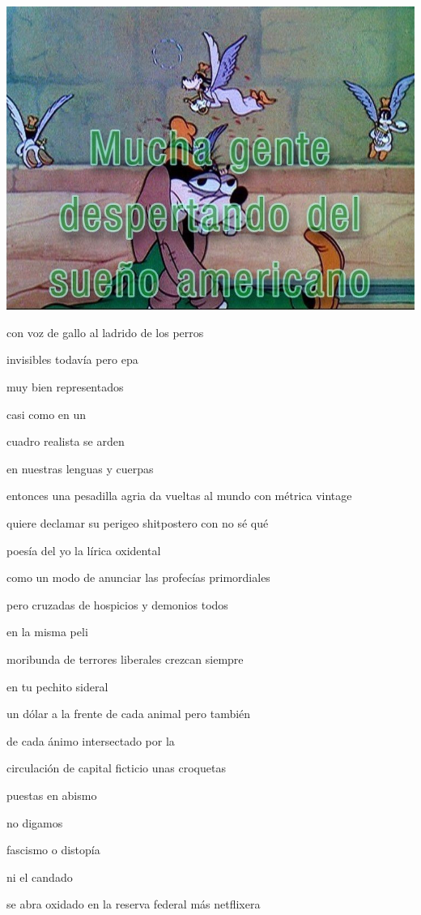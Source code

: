 \documentclass[
]{book}
\begin{document}
\includegraphics{images/14.png}

con voz de gallo al ladrido de los perros

invisibles todavía pero epa

muy bien representados

casi como en un

cuadro realista se arden

en nuestras lenguas y cuerpas

entonces una pesadilla agria da vueltas al mundo con métrica vintage

quiere declamar su perigeo shitpostero con no sé qué

poesía del yo la lírica oxidental

como un modo de anunciar las profecías primordiales

pero cruzadas de hospicios y demonios todos

en la misma peli

moribunda de terrores liberales crezcan siempre

en tu pechito sideral

un dólar a la frente de cada animal pero también

de cada ánimo intersectado por la

circulación de capital ficticio unas croquetas

puestas en abismo

no digamos

fascismo o distopía

ni el candado

se abra oxidado en la reserva federal más netflixera
\end{document}
